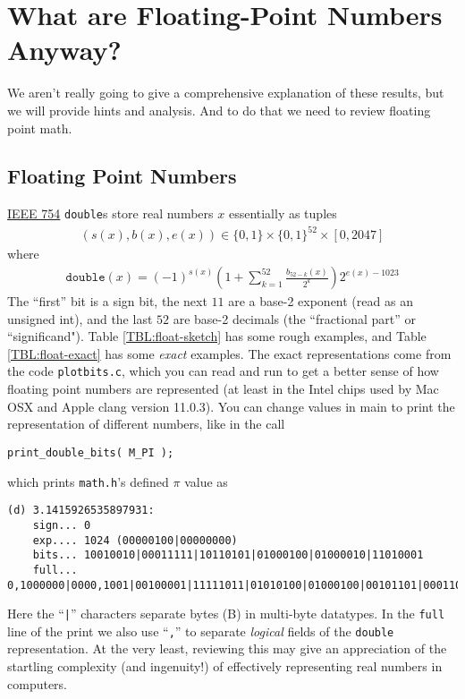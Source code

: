 \documentclass[11pt, oneside]{amsart}   	%
\begin{document}
\section{What are Floating-Point Numbers Anyway?}

We aren't really going to give a comprehensive explanation of these results, but we will provide hints and analysis. And to do that we need to review floating point math. 

\subsection{Floating Point Numbers}

\href{https://en.wikipedia.org/wiki/IEEE_754-2008_revision}{IEEE 754} \texttt{double}s store real numbers $x$ essentially as tuples 
\begin{align*}
    (s(x),b(x),e(x)) \in \{0,1\} \times \{0,1\}^{52} \times [0,2047]
\end{align*}
where
\begin{align*}
    \texttt{double}(x) = (-1)^{s(x)}\left( 1 + \sum_{k=1}^{52} \frac{b_{52-k}(x)}{2^k} \right) 2^{e(x)-1023}
\end{align*}
The ``first'' bit is a sign bit, the next $11$ are a base-2 exponent (read as an unsigned int), and the last $52$ are base-2 decimals (the ``fractional part'' or ``significand"). Table \ref{TBL:float-sketch} has some rough examples, and Table \ref{TBL:float-exact} has some {\em exact} examples. The exact representations come from the code \texttt{plotbits.c}, which you can read and run to get a better sense of how floating point numbers are represented (at least in the Intel chips used by Mac OSX and Apple clang version 11.0.3). You can change values in main to print the representation of different numbers, like in the call
\begin{verbatim}
print_double_bits( M_PI );
\end{verbatim}
which prints \texttt{math.h}'s defined $\pi$ value as
\begin{verbatim}
(d) 3.1415926535897931:
    sign... 0
    exp.... 1024 (00000100|00000000)
    bits... 10010010|00011111|10110101|01000100|01000010|11010001
    full... 0,1000000|0000,1001|00100001|11111011|01010100|01000100|00101101|00011000
\end{verbatim}
Here the ``\texttt{|}'' characters separate bytes (B) in multi-byte datatypes. In the \texttt{full} line of the print we also use ``\texttt{,}'' to separate {\em logical} fields of the \texttt{double} representation. At the very least, reviewing this may give an appreciation of the startling complexity (and ingenuity!) of effectively representing real numbers in computers. 
\end{document}
